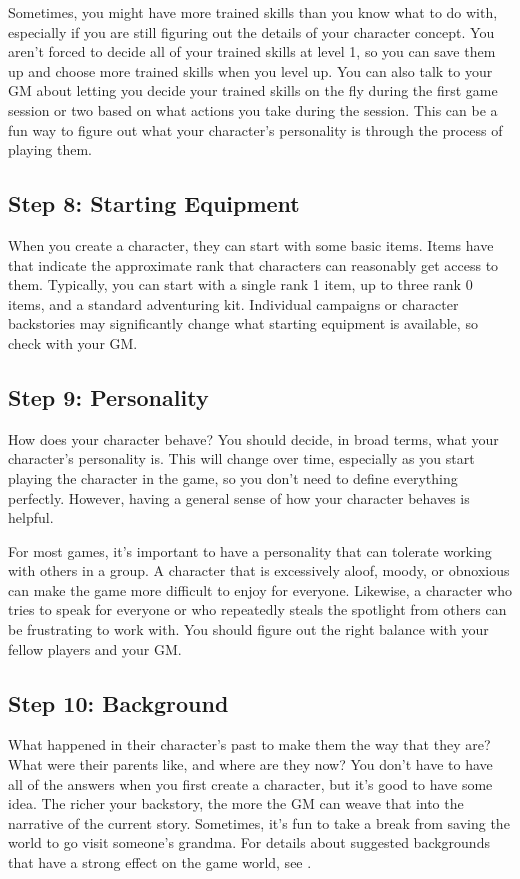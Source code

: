     Sometimes, you might have more trained skills than you know what to do with, especially if you are still figuring out the details of your character concept.
    You aren't forced to decide all of your trained skills at level 1, so you can save them up and choose more trained skills when you level up.
    You can also talk to your GM about letting you decide your trained skills on the fly during the first game session or two based on what actions you take during the session.
    This can be a fun way to figure out what your character's personality is through the process of playing them.

  \subsection{Step 8: Starting Equipment}
    When you create a character, they can start with some basic items.
    Items have  that indicate the approximate rank that characters can reasonably get access to them.
    Typically, you can start with a single rank 1 item, up to three rank 0 items, and a standard adventuring kit.
    Individual campaigns or character backstories may significantly change what starting equipment is available, so check with your GM.

  \subsection{Step 9: Personality}

    How does your character behave?
    You should decide, in broad terms, what your character's personality is.
    This will change over time, especially as you start playing the character in the game, so you don't need to define everything perfectly.
    However, having a general sense of how your character behaves is helpful.

    For most games, it's important to have a personality that can tolerate working with others in a group.
    A character that is excessively aloof, moody, or obnoxious can make the game more difficult to enjoy for everyone.
    Likewise, a character who tries to speak for everyone or who repeatedly steals the spotlight from others can be frustrating to work with.
    You should figure out the right balance with your fellow players and your GM.\@

  \subsection{Step 10: Background}
    What happened in their character's past to make them the way that they are?
    What were their parents like, and where are they now?
    You don't have to have all of the answers when you first create a character, but it's good to have some idea.
    The richer your backstory, the more the GM can weave that into the narrative of the current story.
    Sometimes, it's fun to take a break from saving the world to go visit someone's grandma.
    For details about suggested backgrounds that have a strong effect on the game world, see .

